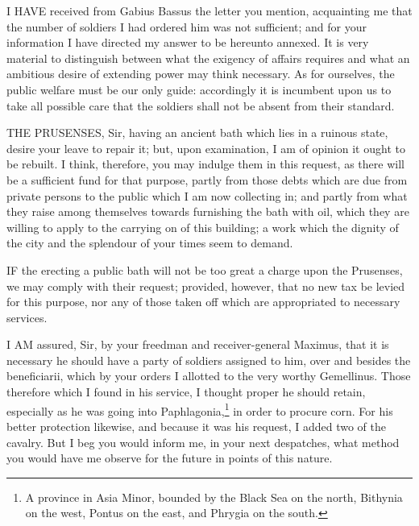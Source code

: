
I HAVE received from Gabius Bassus the letter you mention, acquainting me
that the number of soldiers I had ordered him was not sufficient; and for
your information I have directed my answer to be hereunto annexed. It is
very material to distinguish between what the exigency of affairs requires
and what an ambitious desire of extending power may think necessary. As
for ourselves, the public welfare must be our only guide: accordingly it
is incumbent upon us to take all possible care that the soldiers shall not
be absent from their standard.


THE PRUSENSES, Sir, having an ancient bath which lies in a ruinous state,
desire your leave to repair it; but, upon examination, I am of opinion it
ought to be rebuilt. I think, therefore, you may indulge them in this
request, as there will be a sufficient fund for that purpose, partly from
those debts which are due from private persons to the public which I am
now collecting in; and partly from what they raise among themselves
towards furnishing the bath with oil, which they are willing to apply to
the carrying on of this building; a work which the dignity of the city and
the splendour of your times seem to demand.


IF the erecting a public bath will not be too great a charge upon the
Prusenses, we may comply with their request; provided, however, that no
new tax be levied for this purpose, nor any of those taken off which are
appropriated to necessary services.


I AM assured, Sir, by your freedman and receiver-general Maximus, that it
is necessary he should have a party of soldiers assigned to him, over and
besides the beneficiarii, which by your orders I allotted to the very
worthy Gemellinus. Those therefore which I found in his service, I thought
proper he should retain, especially as he was going into Paphlagonia,\footnote{A province in Asia
Minor, bounded by the Black Sea on the north, Bithynia on the west, Pontus
on the east, and Phrygia on the south.}
in order to procure corn. For his better protection likewise, and because
it was his request, I added two of the cavalry. But I beg you would inform
me, in your next despatches, what method you would have me observe for the
future in points of this nature.

